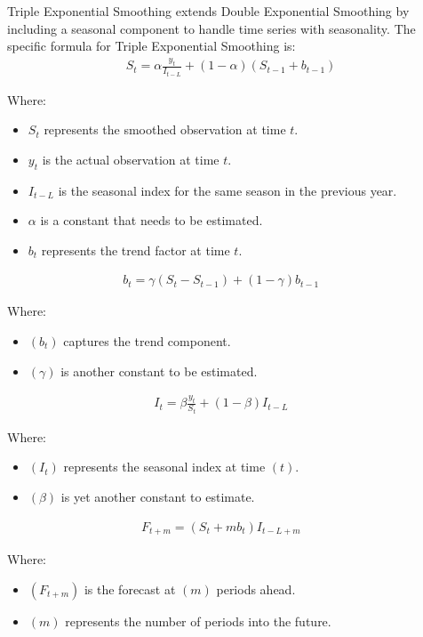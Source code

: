 \documentclass[conference]{IEEEtran}
\begin{document}
Triple Exponential Smoothing extends Double Exponential Smoothing by including a seasonal component to handle time series with seasonality. The specific formula for Triple Exponential Smoothing is: \cite{HoltWinter3}
\begin{align*}
    S_t = \alpha \frac{y_t}{I_{t-L}} + (1-\alpha)(S_{t-1}+b_{t-1}) 
\end{align*}

Where:
\begin{itemize}
\item $S_t$ represents the smoothed observation at time $t$.
\item $y_t$ is the actual observation at time $t$.
\item $I_{t-L}$ is the seasonal index for the same season in the previous year.
\item $\alpha$ is a constant that needs to be estimated.
\item $b_t$ represents the trend factor at time $t$.
\end{itemize}
\begin{align*}
b_t = \gamma (S_t - S_{t-1}) + (1 - \gamma)b_{t-1} & &
\end{align*}

Where:
\begin{itemize}
\item $(b_t)$ captures the trend component.
\item $(\gamma)$ is another constant to be estimated.
\end{itemize}
\begin{align*}
 I_t = \beta \frac{y_t}{S_t} + (1 - \beta) I_{t-L} & &
\end{align*}

Where:
\begin{itemize}
\item $(I_t)$ represents the seasonal index at time $(t)$.
\item $(\beta)$ is yet another constant to estimate.
\end{itemize}
\begin{align*}
F_{t+m} = (S_t + m b_t) I_{t-L+m} & &
\end{align*}

Where:
\begin{itemize}
\item $(F_{t+m})$ is the forecast at $(m)$ periods ahead.
\item $(m)$ represents the number of periods into the future.
\end{itemize}
\end{document}
